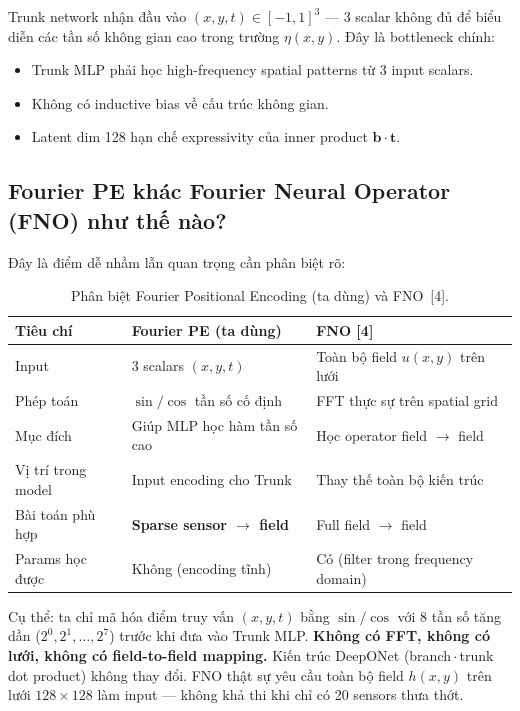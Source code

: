 \documentclass[12pt,a4paper]{article}
\begin{document}
Trunk network nhận đầu vào $(x, y, t) \in [-1,1]^3$ --- 3 scalar không đủ để biểu diễn các tần số không gian cao trong trường $\eta(x,y)$. Đây là bottleneck chính:

\begin{itemize}[nosep]
  \item Trunk MLP phải học high-frequency spatial patterns từ 3 input scalars.
  \item Không có inductive bias về cấu trúc không gian.
  \item Latent dim 128 hạn chế expressivity của inner product $\mathbf{b} \cdot \mathbf{t}$.
\end{itemize}

\subsection{Fourier PE khác Fourier Neural Operator (FNO) như thế nào?}

Đây là điểm dễ nhầm lẫn quan trọng cần phân biệt rõ:

\begin{table}[ht]
  \centering
  \caption{Phân biệt Fourier Positional Encoding (ta dùng) và FNO~[4].}
  \label{tab:fno_vs_fpe}
  \begin{tabular}{@{}lll@{}}
    \toprule
    \textbf{Tiêu chí} & \textbf{Fourier PE (ta dùng)} & \textbf{FNO [4]} \\
    \midrule
    Input & 3 scalars $(x, y, t)$ & Toàn bộ field $u(x,y)$ trên lưới \\
    Phép toán & $\sin/\cos$ tần số cố định & FFT thực sự trên spatial grid \\
    Mục đích & Giúp MLP học hàm tần số cao & Học operator field $\to$ field \\
    Vị trí trong model & Input encoding cho Trunk & Thay thế toàn bộ kiến trúc \\
    Bài toán phù hợp & \textbf{Sparse sensor $\to$ field} & Full field $\to$ field \\
    Params học được & Không (encoding tĩnh) & Có (filter trong frequency domain) \\
    \bottomrule
  \end{tabular}
\end{table}

Cụ thể: ta chỉ mã hóa điểm truy vấn $(x,y,t)$ bằng $\sin/\cos$ với 8 tần số tăng dần ($2^0, 2^1, \ldots, 2^7$) trước khi đưa vào Trunk MLP. \textbf{Không có FFT, không có lưới, không có field-to-field mapping.} Kiến trúc DeepONet (branch\,$\cdot$\,trunk dot product) không thay đổi. FNO thật sự yêu cầu toàn bộ field $h(x,y)$ trên lưới $128{\times}128$ làm input --- không khả thi khi chỉ có 20 sensors thưa thớt.
\end{document}
